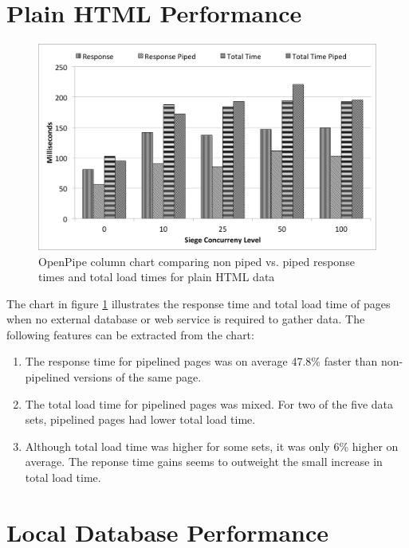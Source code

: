 \documentclass[12pt]{report}
\begin{document}
\section{Plain HTML Performance}

\begin{figure}[H]
\centering
\includegraphics[width=\textwidth,keepaspectratio]{figures/images/analysis_chart_plain.png}
\caption{OpenPipe column chart comparing non piped vs. piped response times and total load times for plain HTML data}
\label{fig:analysisChartPlain}
\end{figure}

The chart in figure \ref{fig:analysisChartPlain} illustrates the response time and total load time of pages when no external database or web service is required to gather data. The following features can be extracted from the chart:

\begin{enumerate}
	\item The response time for pipelined pages was on average 47.8\% faster than non-pipelined versions of the same page.
	\item The total load time for pipelined pages was mixed. For two of the five data sets, pipelined pages had lower total load time.
	\item Although total load time was higher for some sets, it was only 6\% higher on average. The reponse time gains seems to outweight the small increase in total load time.
\end{enumerate}

\section{Local Database Performance}
\end{document}
